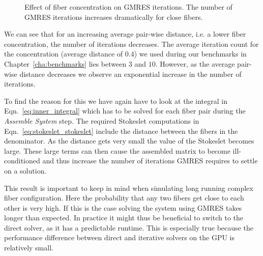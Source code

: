 \begin{figure}[!htbp]
  \centering
  \caption[Effect of fiber concentration on GMRES iterations.]{Effect of fiber concentration on GMRES iterations. The number of GMRES iterations increases dramatically for close fibers.}
  \label{fig:concentration_gmres}
\end{figure}

We can see that for an increasing average pair-wise distance, i.e. a lower fiber concentration, the number of iterations decreases. The average iteration count for the concentration (average distance of $0.4$) we used during our benchmarks in Chapter~\ref{cha:benchmarks} lies between $3$ and $10$. However, as the average pair-wise distance decreases we observe an exponential increase in the number of iterations.

To find the reason for this we have again have to look at the integral in Eqn.~\eqref{eq:inner_integral} which has to be solved for each fiber pair during the \emph{Assemble System} step. The required Stokeslet computations in Eqn.~\eqref{eq:stokeslet_stokeslet} include the distance between the fibers in the denominator. As the distance gets very small the value of the Stokeslet becomes large. These large terms can then cause the assembled matrix to become ill-conditioned and thus increase the number of iterations GMRES requires to settle on a solution.

This result is important to keep in mind when simulating long running complex fiber configuration. Here the probability that any two fibers get close to each other is very high. If this is the case solving the system using GMRES takes longer than expected. In practice it might thus be beneficial to switch to the direct solver, as it has a predictable runtime. This is especially true because the performance difference between direct and iterative solvers on the GPU is relatively small.

